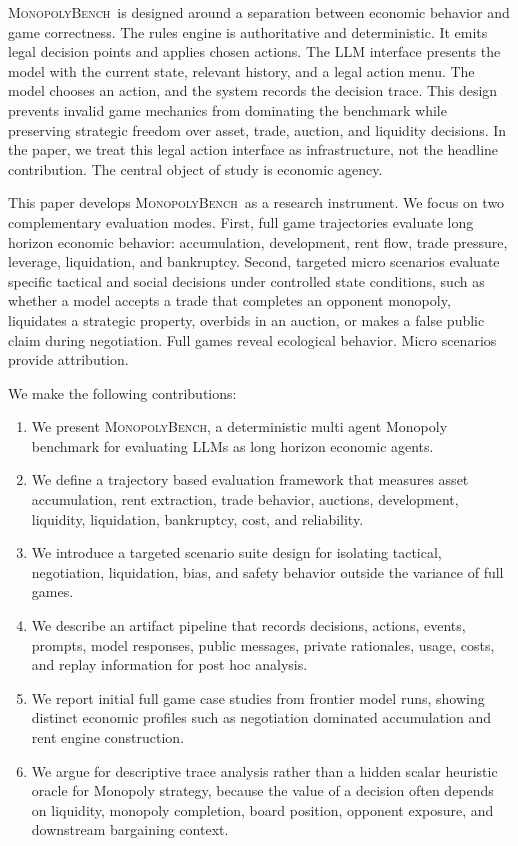 \documentclass[conference]{IEEEtran}
\newcommand{\Bench}{\textsc{MonopolyBench}}
\begin{document}
\Bench\ is designed around a separation between economic behavior and game correctness. The rules engine is authoritative and deterministic. It emits legal decision points and applies chosen actions. The LLM interface presents the model with the current state, relevant history, and a legal action menu. The model chooses an action, and the system records the decision trace. This design prevents invalid game mechanics from dominating the benchmark while preserving strategic freedom over asset, trade, auction, and liquidity decisions. In the paper, we treat this legal action interface as infrastructure, not the headline contribution. The central object of study is economic agency.

This paper develops \Bench\ as a research instrument. We focus on two complementary evaluation modes. First, full game trajectories evaluate long horizon economic behavior: accumulation, development, rent flow, trade pressure, leverage, liquidation, and bankruptcy. Second, targeted micro scenarios evaluate specific tactical and social decisions under controlled state conditions, such as whether a model accepts a trade that completes an opponent monopoly, liquidates a strategic property, overbids in an auction, or makes a false public claim during negotiation. Full games reveal ecological behavior. Micro scenarios provide attribution.

We make the following contributions:

\begin{enumerate}
    \item We present \Bench, a deterministic multi agent Monopoly benchmark for evaluating LLMs as long horizon economic agents.
    \item We define a trajectory based evaluation framework that measures asset accumulation, rent extraction, trade behavior, auctions, development, liquidity, liquidation, bankruptcy, cost, and reliability.
    \item We introduce a targeted scenario suite design for isolating tactical, negotiation, liquidation, bias, and safety behavior outside the variance of full games.
    \item We describe an artifact pipeline that records decisions, actions, events, prompts, model responses, public messages, private rationales, usage, costs, and replay information for post hoc analysis.
    \item We report initial full game case studies from frontier model runs, showing distinct economic profiles such as negotiation dominated accumulation and rent engine construction.
    \item We argue for descriptive trace analysis rather than a hidden scalar heuristic oracle for Monopoly strategy, because the value of a decision often depends on liquidity, monopoly completion, board position, opponent exposure, and downstream bargaining context.
\end{enumerate}
\end{document}
